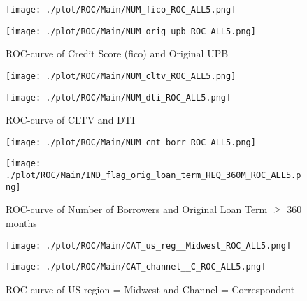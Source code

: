 \begin{figure}[H]
\begin{minipage}{.5\textwidth}
	\centering
	\texttt{[image: ./plot/ROC/Main/NUM\_fico\_ROC\_ALL5.png]}
\end{minipage}%
\begin{minipage}{.5\textwidth}
	\centering
	\texttt{[image: ./plot/ROC/Main/NUM\_orig\_upb\_ROC\_ALL5.png]}
\end{minipage}
    \caption{ROC-curve of Credit Score (fico) and Original UPB}
    \label{fig:re_fico_upb}
\end{figure}
\begin{figure}[H]
\begin{minipage}{.5\textwidth}
	\centering
	\texttt{[image: ./plot/ROC/Main/NUM\_cltv\_ROC\_ALL5.png]}
\end{minipage}%
\begin{minipage}{.5\textwidth}
	\centering
	\texttt{[image: ./plot/ROC/Main/NUM\_dti\_ROC\_ALL5.png]}
\end{minipage}
    \caption{ROC-curve of CLTV and DTI}
\end{figure}
\begin{figure}[H]
\begin{minipage}{.5\textwidth}
	\centering
	\texttt{[image: ./plot/ROC/Main/NUM\_cnt\_borr\_ROC\_ALL5.png]}
\end{minipage}%
\begin{minipage}{.5\textwidth}
	\centering
	\texttt{[image: ./plot/ROC/Main/IND\_flag\_orig\_loan\_term\_HEQ\_360M\_ROC\_ALL5.png]}
\end{minipage}
    \caption{ROC-curve of Number of Borrowers and Original Loan Term $\geq$ 360 months}
\end{figure}
\begin{figure}[H]
\begin{minipage}{.5\textwidth}
	\centering
	\texttt{[image: ./plot/ROC/Main/CAT\_us\_reg\_\_Midwest\_ROC\_ALL5.png]}
\end{minipage}%
\begin{minipage}{.5\textwidth}
	\centering
	\texttt{[image: ./plot/ROC/Main/CAT\_channel\_\_C\_ROC\_ALL5.png]}
\end{minipage}
    \caption{ROC-curve of US region = Midwest and Channel = Correspondent}
    \label{fig:re_usreg_channel}
\end{figure}

